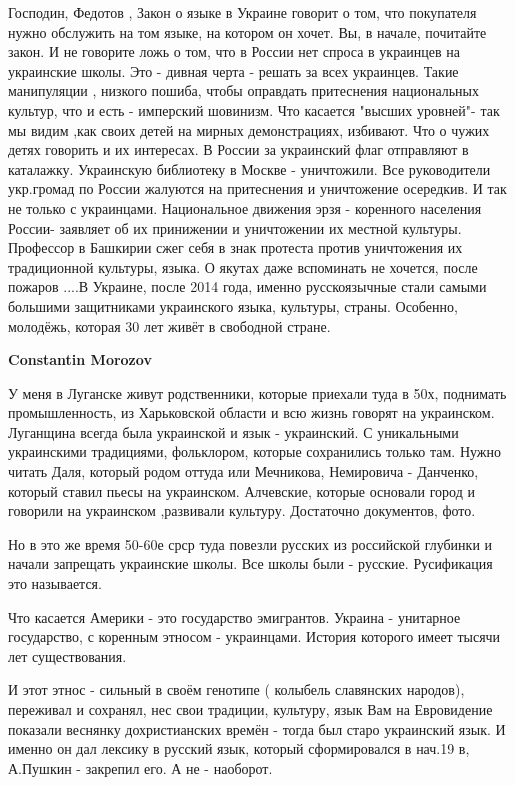 \begin{itemize}
\begin{itemize}
Господин, Федотов , Закон о языке в Украине говорит о том, что покупателя нужно
обслужить на том языке, на котором он хочет. Вы, в начале, почитайте закон. И
не говорите ложь о том, что в России нет спроса в украинцев на украинские
школы. Это - дивная черта - решать за всех украинцев. Такие манипуляции ,
низкого пошиба, чтобы оправдать притеснения национальных культур, что и есть -
имперский шовинизм. Что касается "высших уровней"- так мы видим ,как своих
детей на мирных демонстрациях, избивают. Что о чужих детях говорить и их
интересах. В России за украинский флаг отправляют в каталажку. Украинскую
библиотеку в Москве - уничтожили. Все руководители укр.громад по России
жалуются на притеснения и уничтожение осередкив. И так не только с украинцами.
Национальное движения эрзя - коренного населения России- заявляет об их
принижении и уничтожении их местной культуры. Профессор в Башкирии сжег себя в
знак протеста против уничтожения их традиционной культуры, языка. О якутах даже
вспоминать не хочется, после пожаров ....В Украине, после 2014 года, именно
русскоязычные стали самыми большими защитниками украинского языка, культуры,
страны. Особенно, молодёжь, которая 30 лет живёт в свободной стране.

\textbf{Constantin Morozov} 

У меня в Луганске живут родственники, которые приехали туда в 50х, поднимать
промышленность, из Харьковской области и всю жизнь говорят на украинском.
Луганщина всегда была украинской и язык - украинский. С уникальными украинскими
традициями, фольклором, которые сохранились только там. Нужно читать Даля,
который родом оттуда или Мечникова, Немировича - Данченко, который ставил пьесы
на украинском. Алчевские, которые основали город и говорили на украинском
,развивали культуру. Достаточно документов, фото. 

Но в это же время 50-60е срср туда повезли русских из российской глубинки и
начали запрещать украинские школы. Все школы были - русские. Русификация это
называется. 

Что касается Америки - это государство эмигрантов. Украина - унитарное
государство, с коренным этносом - украинцами. История которого имеет тысячи лет
существования.

И этот этнос - сильный в своём генотипе ( колыбель славянских народов),
переживал и сохранял, нес свои традиции, культуру, язык Вам на Евровидение
показали веснянку дохристианских времён - тогда был старо украинский язык. И
именно он дал лексику в русский язык, который сформировался в нач.19 в,
А.Пушкин - закрепил его. А не - наоборот. 


\end{itemize}
\end{itemize}
